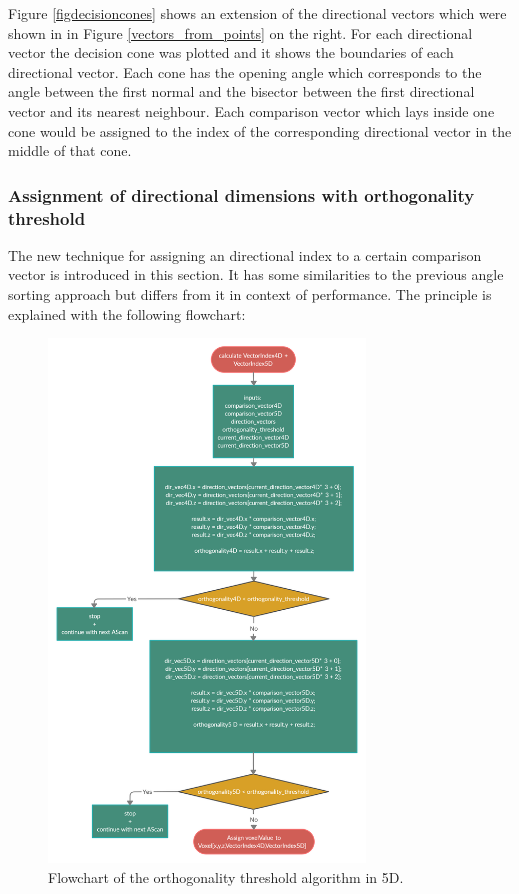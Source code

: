 Figure \ref{figdecisioncones} shows an extension of the directional vectors which were shown in in Figure \ref{vectors_from_points} on the right. For each directional vector the decision cone was plotted and it shows the boundaries of each directional vector. Each cone has the opening angle which corresponds to the angle between the first normal and the bisector between the first directional vector and its nearest neighbour. Each comparison vector which lays inside one cone would be assigned to the index of the corresponding directional vector in the middle of that cone.

\subsubsection{Assignment of directional dimensions with orthogonality threshold}

The new technique for assigning an directional index to a certain comparison vector is introduced in this section. It has some similarities to the previous angle sorting approach but differs from it in context of performance. The principle is explained with the following flowchart:

\begin{figure}[H]
    \centering
    \includegraphics[width=0.75\textwidth]{Graphics/Fringe_Orthogonality.png}
    \caption{Flowchart of the orthogonality threshold algorithm in 5D.}
    \label{ortho_threshold_flow}
\end{figure}

